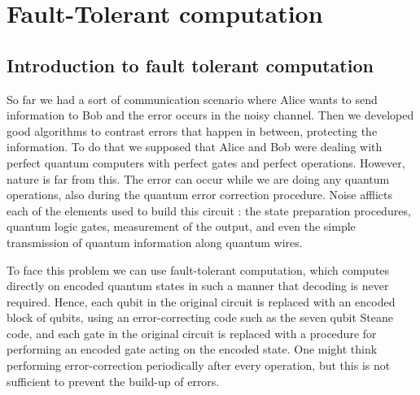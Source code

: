\chapter{Fault-Tolerant computation}
\section{Introduction to fault tolerant computation}
So far we had a sort of communication scenario where Alice wants to send information to Bob and the error occurs in the noisy channel. 
Then we developed good algorithms to contrast errors that happen in between, protecting the information.
To do that we supposed that Alice and Bob were dealing with perfect quantum computers with perfect gates and perfect operations. 
However, nature is far from this. 
The error can occur while we are doing any quantum operations, also during the quantum error correction procedure.
Noise afflicts each of the elements used to build this circuit : the state preparation procedures, quantum logic gates, measurement of the output, and even the simple transmission of quantum information along quantum wires.

To face this problem we can use fault-tolerant computation, which computes directly on encoded quantum states in such a manner that decoding is never required. Hence, each qubit in the original circuit is replaced with an encoded block of qubits, using an error-correcting code such as the seven qubit Steane code, and each gate in the original circuit is replaced with a procedure for performing an encoded gate acting on the encoded state. 
One might think performing error-correction periodically after every operation, but this is not sufficient to prevent the build-up of errors.

